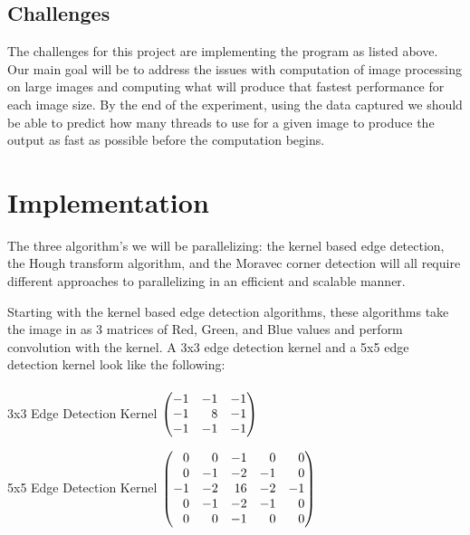 \documentclass{article}
\begin{document}
\begin{multicols}{2}
            \subsection{Challenges}
                The challenges for this project are implementing the program as listed above.  Our main goal will be to address the issues with computation of image processing on large images and computing what will produce that fastest performance for each image size. By the end of the experiment, using the data captured we should be able to predict how many threads to use for a given image to produce the output as fast as possible before the computation begins.
                
            \end{multicols}
            
    
    \section{Implementation}
        The three algorithm's we will be parallelizing: the kernel based edge detection, the Hough transform algorithm, and the Moravec corner detection will all require different approaches to parallelizing in an efficient and scalable manner.
        
        Starting with the kernel based edge detection algorithms, these algorithms take the image in as 3 matrices of Red, Green, and Blue values and perform convolution with the kernel.  A 3x3 edge detection kernel and a 5x5 edge detection kernel look like the following:\\\\
        
        3x3 Edge Detection Kernel
        $\begin{pmatrix*}[r]
        -1 & -1 & -1\\
        -1 &  8 & -1\\
        -1 & -1 & -1
        \end{pmatrix*}\\\\$
        
        5x5 Edge Detection Kernel
        $\begin{pmatrix*}[r]
        0 &   0 & -1 &  0 &  0\\
        0 &  -1 & -2 & -1 &  0\\
        -1 & -2 & 16 & -2 & -1\\
        0 &  -1 & -2 & -1 &  0\\
        0 &   0 & -1 &  0 &  0
        \end{pmatrix*}\\\\$
        
\end{document}
